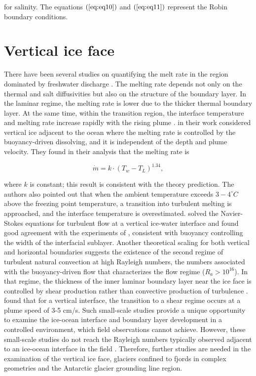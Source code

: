 \documentclass[11pt,a4paper]{article}
\begin{document}
	\noindent for salinity. The equations $(\ref{eq:eq10})$ and $(\ref{eq:eq11})$ represent the Robin boundary conditions.
	
	\section{Vertical ice face}
	
	There have been several studies on quantifying the melt rate in the region dominated by freshwater discharge \citep{wells2011melting, kerr2015dissolution, gayen2016simulation}.
     The melting rate depends not only on the thermal and salt diffusivities but also on the structure of the boundary layer. In the laminar regime, the melting rate is lower due to the thicker thermal boundary layer. At the same time, within the transition region, the interface temperature and melting rate increase rapidly with the rising plume \citep{gayen2016simulation}. \cite{kerr2015dissolution} in their work considered vertical ice adjacent to the ocean where the melting rate is controlled by the buoyancy-driven dissolving, and it is independent of the depth and plume velocity. They found in their analysis that the melting rate is 
	
	\begin{equation}
	    \dot{m} = k\cdot (T_w-T_L)^{1.34},
	\end{equation}
	
	\noindent where $k$ is constant; this result is consistent with the theory prediction. The authors also pointed out that when the ambient temperature exceeds $3-4^{\circ} C$ above the freezing point temperature, a transition into turbulent melting is approached, and the interface temperature is overestimated. \cite{gayen2016simulation} solved the Navier-Stokes equations for turbulent flow at a vertical ice-water interface and found good agreement with the experiments of \cite{kerr2015dissolution}, consistent with buoyancy controlling the width of the interfacial sublayer. Another theoretical scaling for both vertical and horizontal boundaries suggests the existence of the second regime of turbulent natural convection at high Rayleigh numbers, the numbers associated with the buoyancy-driven flow that characterizes the flow regime ($R_a> 10^{16}$). In that regime, the thickness of the inner laminar boundary layer near the ice face is controlled by shear production rather than convective production of turbulence \citep{grossmann2000scaling, wells2008geophysical,kerr2015dissolution,gayen2016simulation}. \cite{mcconnochie2017using} found that for a vertical interface, the transition to a shear regime occurs at a plume speed of 3-5 cm/s. Such small-scale studies provide a unique opportunity to examine the ice-ocean interface and boundary layer development in a controlled environment, which field observations cannot achieve. However, these small-scale studies do not reach the Rayleigh numbers typically observed adjacent to an ice-ocean interface in the field \citep{malyarenko2020synthesis}. Therefore, further studies are needed in the examination of the vertical ice face, glaciers confined to fjords in complex geometries and the Antarctic glacier grounding line region.
\end{document}
